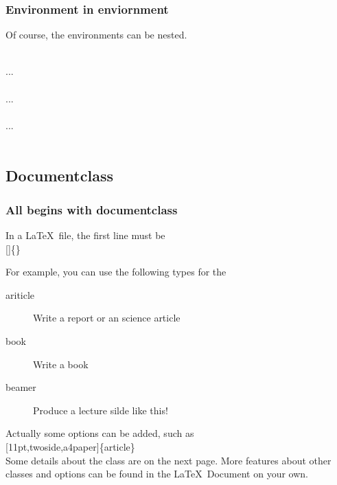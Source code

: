 \begin{frame}
	\frametitle{Environment in enviornment}
	Of course, the environments can be nested.\\
	\begin{example}
		\\
		\qquad ...\\
		\qquad{}\\
		\qquad\qquad ...\\
		\qquad{}\\
		\qquad ...\\
		\\
	\end{example}
\end{frame}


\subsection{Documentclass}

\begin{frame}
	\frametitle{All begins with documentclass}
	\begin{definition}
		In a \LaTeX\ file, the {\color{blue}first} line must be \\
		[]\{\}
	\end{definition}
	For example, you can use the following types for the \\
	\begin{description}
		\item[ariticle]	Write a report or an science article
		\item[book] 	Write a book
		\item[beamer]	Produce a lecture silde like this!
	\end{description}
	Actually some options can be added, such as\\[0.5em]
	[11pt,twoside,a4paper]\{article\}\\[0.5em]
	Some details about the  class are on the next page. More features about other classes and options can be found in the \LaTeX\ Document on your own.
\end{frame}

